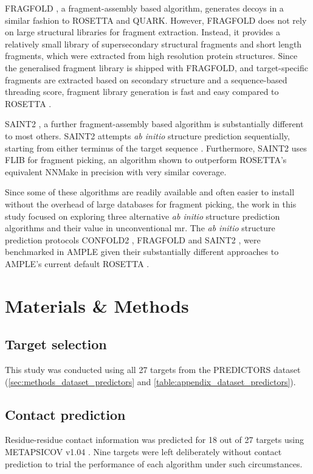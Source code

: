FRAGFOLD \cite{Jones2001-mc}, a fragment-assembly based algorithm, generates decoys in a similar fashion to ROSETTA and QUARK. However, FRAGFOLD does not rely on large structural libraries for fragment extraction. Instead, it provides a relatively small library of supersecondary structural fragments and short length fragments, which were extracted from high resolution protein structures. Since the generalised fragment library is shipped with FRAGFOLD, and target-specific fragments are extracted based on secondary structure and a sequence-based threading score, fragment library generation is fast and easy compared to ROSETTA \cite{Kosciolek2014-bt}.

SAINT2 \cite{De_Oliveira2017-sg}, a further fragment-assembly based algorithm is substantially different to most others. SAINT2 attempts \textit{ab initio} structure prediction sequentially, starting from either terminus of the target sequence \cite{De_Oliveira2017-sg}. Furthermore, SAINT2 uses FLIB \cite{De_Oliveira2015-kb} for fragment picking, an algorithm shown to outperform ROSETTA's equivalent NNMake \cite{Gront2011-sv} in precision with very similar coverage.

Since some of these algorithms are readily available and often easier to install without the overhead of large databases for fragment picking, the work in this study focused on exploring three alternative \textit{ab initio} structure prediction algorithms and their value in unconventional \gls{mr}. The \textit{ab initio} structure prediction protocols CONFOLD2 \cite{Adhikari2018-lj}, FRAGFOLD \cite{Jones2001-mc} and SAINT2 \cite{De_Oliveira2017-sg}, were benchmarked in AMPLE given their substantially different approaches to AMPLE's current default ROSETTA \cite{Rohl2004-dj}.

\section{Materials \& Methods}
\subsection{Target selection}
This study was conducted using all 27 targets from the PREDICTORS dataset (\cref{sec:methods_dataset_predictors} and \cref{table:appendix_dataset_predictors}).

\subsection{Contact prediction}
Residue-residue contact information was predicted for 18 out of 27 targets using METAPSICOV v1.04 \cite{Jones2015-vq}. Nine targets were left deliberately without contact prediction to trial the performance of each algorithm under such circumstances.

